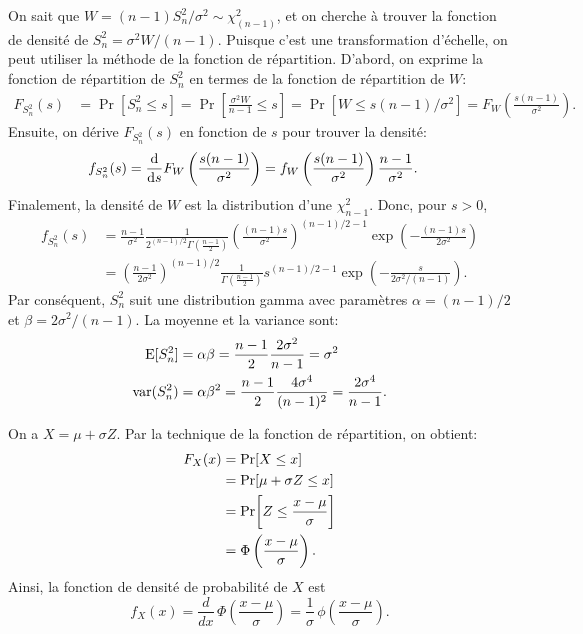 \begin{solution}{2.7}
On sait que $W=(n-1)S_n^2/\sigma^2\sim \chi^2_{(n-1)}$, et on cherche à trouver la fonction de densité de $S_n^2=\sigma^2 W /(n-1)$. Puisque c'est une transformation d'échelle, on peut utiliser la méthode de la fonction de répartition. D'abord, on exprime la fonction de répartition de $S_n^2$ en termes de la fonction de répartition de $W$:
\begin{align*}
F_{S_n^2}(s)&=\Pr[S_n^2\leq s]=\Pr\left[\frac{\sigma^2 W}{n-1}\leq s\right]=\Pr[W\leq s(n-1)/\sigma^2]=F_W\left(\frac{s(n-1)}{\sigma^2}\right).
\end{align*}
Ensuite, on dérive $F_{S_n^2}(s)$ en fonction de $s$ pour trouver la densité:
\begin{align*}
f_{S_n^2}(s) &=\frac{\mbox{d}}{\mbox{d} s}F_W\left(\frac{s(n-1)}{\sigma^2}\right) = f_W\left(\frac{s(n-1)}{\sigma^2}\right)\frac{n-1}{\sigma^2}.
\end{align*}
Finalement, la densité de $W$ est la distribution d'une $\chi^2_{n-1}$. Donc, pour $s>0$,
\begin{align*}
f_{S_n^2}(s) &= \frac{n-1}{\sigma^2}\frac{1}{2^{(n-1)/2}\Gamma(\frac{n-1}{2})}\left(\frac{(n-1)s}{\sigma^2}\right)^{(n-1)/2-1}\exp\left(-\frac{(n-1)s}{2\sigma^2}\right)\\
&=\left(\frac{n-1}{2\sigma^2}\right)^{(n-1)/2}\frac{1}{\Gamma(\frac{n-1}{2})}s^{(n-1)/2-1}\exp\left(-\frac{s}{2\sigma^2/(n-1)}\right).
\end{align*}
Par conséquent, $S_n^2$ suit une distribution gamma avec paramètres $\alpha=(n-1)/2$ et $\beta=2\sigma^2/(n-1)$. La moyenne et la variance sont:
\begin{align*}
\operatorname{E}[S_n^2]&= \alpha\beta= \frac{n-1}{2}\frac{2\sigma^2}{n-1}=\sigma^2\\
\operatorname{var}(S_n^2)&=\alpha\beta^2=\frac{n-1}{2}\frac{4\sigma^4}{(n-1)^2}=\frac{2\sigma^4}{n-1}.
\end{align*}
\end{solution}
\begin{solution}{2.8}
    On a $X = \mu + \sigma Z$. Par la technique de la fonction de
    répartition, on obtient:
    \begin{align*}
      F_X(x) &= \mathrm{Pr} [ X \leq x ]\\
      &= \mathrm{Pr} [ \mu + \sigma Z \leq x ]\\
      &= \mathrm{Pr}\! \left[ Z \leq \frac{x - \mu}{\sigma} \right]\\
      &= \Phi\left(\frac{x-\mu}{\sigma}\right).
    \end{align*}
    Ainsi, la fonction de densité de probabilité de $X$ est
    \begin{displaymath}
      f_X(x) = \frac{d}{dx}\, \Phi\left(\frac{x - \mu}{\sigma}\right) =
      \frac{1}{\sigma}\, \phi\left(\frac{x-\mu}{\sigma}\right).
    \end{displaymath}
  
\end{solution}
